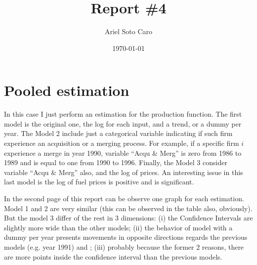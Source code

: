 \documentclass[a4paper]{article}
\title{Report \#4}
\author{Ariel Soto Caro}
\date{\today}
\begin{document}
\maketitle

\section*{Pooled estimation}
In this case I just perform an estimation for the production function. The first model is the original one, the log for each input, and a trend, or a dummy per year. The Model 2 include just a categorical variable indicating if such firm experience an acquisition or a merging process. For example, if a specific firm $i$ experience a merge in year 1990, variable ``Acqu \& Merg'' is zero from 1986 to 1989 and is equal to one from 1990 to 1996. Finally, the Model 3 consider variable ``Acqu \& Merg'' also, and the log of prices. An interesting issue in this last model is the log of fuel prices is positive and is significant.

In the second page of this report can be observe one graph for each estimation. Model 1 and 2 are very similar (this can be observed in the table also, obviously). But the model 3 differ of the rest in 3 dimensions: (i) the Confidence Intervals are slightly more wide than the other models; (ii) the behavior of model with a dummy per year presents movements in opposite directions regards the previous models (e.g. year 1991) and ; (iii) probably because the former 2 reasons, there are more points inside the confidence interval than the previous models.
\end{document}

